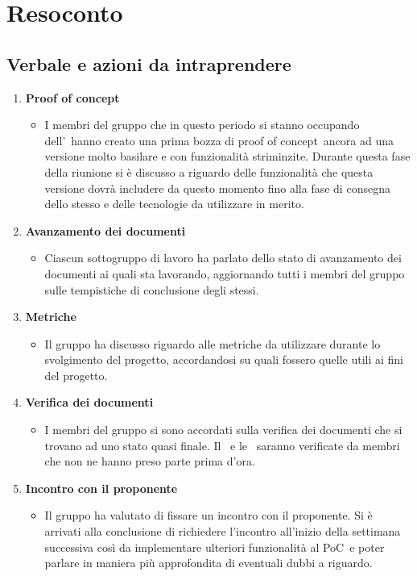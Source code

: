 \section{Resoconto}
\subsection{Verbale e azioni da intraprendere}
\begin{enumerate}
	\item \textbf{Proof of concept\glo}
	\begin{itemize}
		\item I membri del gruppo che in questo periodo si stanno occupando dell'\docNameAdRLow\ hanno creato una prima bozza di proof of concept\glo\ ancora ad una versione molto basilare e con funzionalità striminzite.
			  Durante questa fase della riunione si è discusso a riguardo delle funzionalità che questa versione dovrà includere da questo momento fino alla fase di consegna dello stesso e delle tecnologie da utilizzare
			  in  merito.
	\end{itemize}
	\item \textbf{Avanzamento dei documenti}
	\begin{itemize}
		\item Ciascun sottogruppo di lavoro ha parlato dello stato di avanzamento dei documenti ai quali sta lavorando, aggiornando tutti i membri del gruppo sulle tempistiche di conclusione degli stessi.
	\end{itemize}
	\item \textbf{Metriche}
	\begin{itemize}
		\item Il gruppo ha discusso riguardo alle metriche da utilizzare durante lo svolgimento del progetto, accordandosi su quali fossero quelle utili ai fini del progetto. 
	\end{itemize}
	\item \textbf{Verifica dei documenti}
	\begin{itemize}
		\item I membri del gruppo si sono accordati sulla verifica dei documenti che si trovano ad uno stato quasi finale. Il \docNamePdPLow\ e le \docNameNdPLow\ saranno verificate da membri che non ne hanno preso parte prima d'ora.
	\end{itemize}
	\item \textbf{Incontro con il proponente}
	\begin{itemize}
		\item Il gruppo ha valutato di fissare un incontro con il proponente. Si è arrivati alla conclusione di richiedere l'incontro all'inizio della settimana successiva così da implementare ulteriori funzionalità al PoC\glo\
			  e poter parlare in maniera più approfondita di eventuali dubbi a riguardo.
	\end{itemize}
\end{enumerate}

